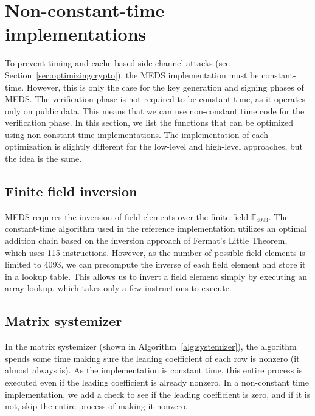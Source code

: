 \documentclass[11pt,a4paper]{report}
\theoremstyle{definition}
\begin{document}
\section{Non-constant-time implementations}
\label{sec:nonconstanttime}
To prevent timing and cache-based side-channel attacks (see Section~\ref{sec:optimizingcrypto}), the MEDS implementation must be constant-time. However, this is only the case for the key generation and signing phases of MEDS. The verification phase is not required to be constant-time, as it operates only on public data. This means that we can use non-constant time code for the verification phase. In this section, we list the functions that can be optimized using non-constant time implementations. The implementation of each optimization is slightly different for the low-level and high-level approaches, but the idea is the same.

\subsection{Finite field inversion}
MEDS requires the inversion of field elements over the finite field $\mathbb{F}_{4093}$. The constant-time algorithm used in the reference implementation utilizes an optimal addition chain based on the inversion approach of Fermat's Little Theorem, which uses 115 instructions. However, as the number of possible field elements is limited to 4093, we can precompute the inverse of each field element and store it in a lookup table. This allows us to invert a field element simply by executing an array lookup, which takes only a few instructions to execute.

\subsection{Matrix systemizer}
In the matrix systemizer (shown in Algorithm~\ref{alg:systemizer}), the algorithm spends some time making sure the leading coefficient of each row is nonzero (it almost always is). As the implementation is constant time, this entire process is executed even if the leading coefficient is already nonzero. In a non-constant time implementation, we add a check to see if the leading coefficient is zero, and if it is not, skip the entire process of making it nonzero.
\end{document}
